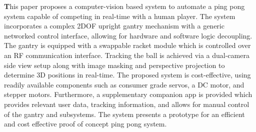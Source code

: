 \textbf
This paper proposes a computer-vision based system to automate a ping pong system capable of competing in real-time with a human player. The system incorporates a complex 2DOF upright gantry mechanism with a generic networked control interface, allowing for hardware and software logic decoupling. The gantry is equipped with a swappable racket module which is controlled over an RF communication interface. Tracking the ball is achieved via a dual-camera side view setup along with image masking and perspective projection to determine 3D positions in real-time. The proposed system is cost-effective, using readily available components such as consumer grade servos, a DC motor, and stepper motors. Furthermore, a supplementary companion app is provided which provides relevant user data, tracking information, and allows for manual control of the gantry and subsystems. The system presents a prototype for an efficient and cost effective proof of concept ping pong system.